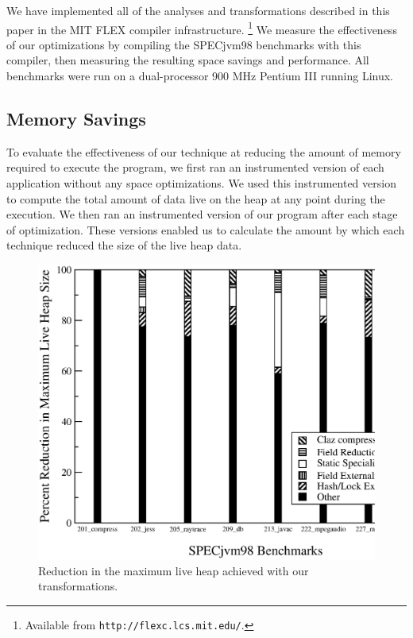 \documentclass{acmconf}
\begin{document}
We have implemented all of the analyses and transformations described
in this paper in the MIT FLEX compiler infrastructure.%
\footnote{Available from {\tt http://flexc.lcs.mit.edu/}.} 
We measure the effectiveness
of our optimizations by compiling the SPECjvm98 benchmarks with 
this compiler, then measuring the resulting space savings and
performance.   All benchmarks were run on a dual-processor 900 MHz
Pentium III running Linux.

\subsection{Memory Savings}

To evaluate the effectiveness of our technique at reducing the
amount of memory required to execute the program, 
we first ran an instrumented version of each
application without any space optimizations. We used this
instrumented version to compute the total amount of data live on the
heap at any point during the execution.  
We then ran an instrumented version of our program after each stage of
optimization.
These versions enabled us to calculate the amount by which each 
technique reduced the size of the live heap data.

\begin{figure}
\includegraphics[scale=0.32,clip=true]{Figures/oopsla-ttllive.eps}
\caption{Reduction in the maximum live heap achieved with our
  transformations.}
\label{fig:live-heap}
\end{figure}
\end{document}
